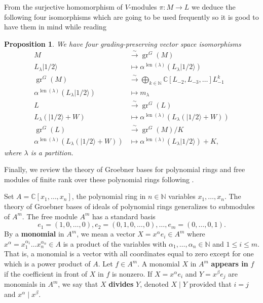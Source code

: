 \documentclass[12pt,a4paper]{article}
\newtheorem{proposition}{Proposition}
\DeclareMathOperator{\gr}{gr}
\DeclareMathOperator{\len}{len}
\newcommand{\vachalf}{|1/2\rangle}
\begin{document}
From the surjective homomorphism of $V$-modules $\pi:M\to L$ we deduce the following four isomorphisms which are going to be used frequently so it is good to have them in mind while reading
\begin{proposition}
  \label{prp:6}
  We have four grading-preserving vector space isomorphisms
  \begin{align*}
    M&\xrightarrow{\sim} \gr^G(M) \\
    L_\lambda\vachalf&\mapsto \alpha^{\len(\lambda)}(L_\lambda\vachalf) \\
    \gr^G(M)&\xrightarrow{\sim}\bigoplus_{k\in \mathbb{N}}\mathbb{C}[L_{-2},L_{-3},\dots]L_{-1}^k \\
    \alpha^{\len(\lambda)}(L_\lambda\vachalf)&\mapsto m_\lambda \\
    L&\xrightarrow{\sim} \gr^G(L) \\
    L_\lambda(\vachalf+W)&\mapsto \alpha^{\len(\lambda)}(L_\lambda(\vachalf+W)) \\
    \gr^G(L)&\xrightarrow{\sim} \gr^G(M)/K \\
    \alpha^{\len(\lambda)}(L_\lambda(\vachalf+W))&\mapsto \alpha^{\len(\lambda)}(L_\lambda\vachalf)+K,
  \end{align*}
  where $\lambda$ is a partition.
\end{proposition}

Finally, we review the theory of Groebner bases for polynomial rings and free modules of finite rank over these polynomial rings following \cite{adams_introduction_1994}.

Set $A=\mathbb{C}[x_1,\dots,x_n]$, the polynomial ring in $n\in \mathbb{N}$ variables $x_1,\dots, x_n$.
The theory of Groebner bases of ideals of polynomial rings generalizes to submodules of $A^m$.
The free module $A^m$ has a standard basis
\begin{equation*}
  e_1=(1,0,\dots,0), e_2=(0,1,0,\dots, 0), \dots, e_m=(0,\dots, 0, 1).
\end{equation*}
By a \textbf{monomial} in $A^m$, we mean a vector $X=x^\alpha e_i\in A^m$ where $x^\alpha=x_1^{\alpha_1}\dots x_n^{\alpha_n}\in A$ is a product of the variables with $\alpha_1,\dots,\alpha_n\in \mathbb{N}$ and $1\le i \le m$.
That is, a monomial is a vector with all coordinates equal to zero except for one which is a power product of $A$.
Let $f\in A^m$.
A monomial $X$ in $A^m$ \textbf{appears in} $f$ if the coefficient in front of $X$ in $f$ is nonzero.
If $X=x^\alpha e_i$ and $Y=x^\beta e_j$ are monomials in $A^m$, we say that $X$ \textbf{divides} $Y$, denoted $X\mid Y$ provided that $i=j$ and $x^\alpha\mid x^\beta$.
\end{document}

